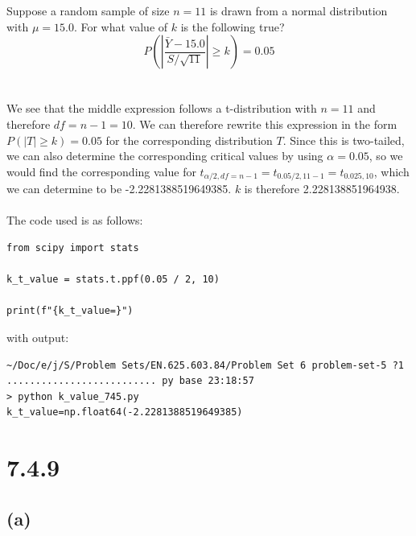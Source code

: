 \documentclass{article}
\begin{document}
{Suppose a random sample of size \(n = 11\) is drawn from a normal distribution with \(\mu = 15.0\). For what value of \(k\) is the following true? 
\[
P(\left|\frac{\bar{Y} - 15.0}{S / \sqrt{11}}\right| \geq k) = 0.05
\]
\\
\\
We see that the middle expression follows a t-distribution with \(n = 11\) and therefore \(df = n - 1 = 10\). We can therefore rewrite this expression in the form \(P(|T| \geq k) = 0.05\) for the corresponding distribution \(T\). Since this is two-tailed, we can also determine the corresponding critical values by using \(\alpha = 0.05\), so we would find the corresponding value for \(t_{\alpha / 2, df = n-1} = t_{0.05 / 2, 11 - 1} = t_{0.025, 10}\), which we can determine to be -2.2281388519649385. \(k\) is therefore 2.228138851964938. 
\\
\\
The code used is as follows:
\begin{verbatim}
from scipy import stats

k_t_value = stats.t.ppf(0.05 / 2, 10)

print(f"{k_t_value=}")
\end{verbatim}
with output:
\begin{verbatim}
~/Doc/e/j/S/Problem Sets/EN.625.603.84/Problem Set 6 problem-set-5 ?1 .......................... py base 23:18:57
> python k_value_745.py 
k_t_value=np.float64(-2.2281388519649385)
\end{verbatim}

\section*{7.4.9}

\subsection*{(a)}

}
\end{document}
